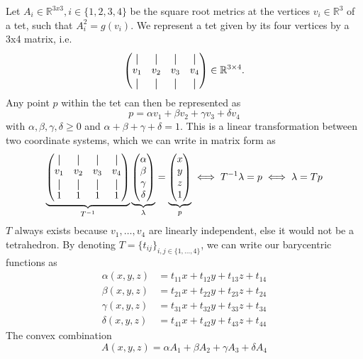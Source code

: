 \documentclass[../thesis.tex]{subfiles}
\begin{document}
Let $A_i \in \mathbb{R}^{3x3}, i \in \{1,2,3,4\}$ be the square root metrics at the vertices $v_i \in \mathbb{R}^3$ of a tet, such that
$A^2_i = g(v_i)$. We represent a tet given by its four vertices by a 3x4 matrix, i.e.
$$\begin{pmatrix}
  \vertbar & \vertbar & \vertbar & \vertbar \\
  v_1 & v_2 & v_3 & v_4 \\
  \vertbar & \vertbar & \vertbar & \vertbar
\end{pmatrix} \in \mathbb{R}^{3\times 4}.$$
Any point $p$ within the tet can then be represented as
$$p = \alpha v_1 + \beta v_2 + \gamma v_3 + \delta v_4$$
with $\alpha, \beta, \gamma, \delta \ge 0$ and $\alpha + \beta + \gamma + \delta = 1$.
This is a linear transformation between two coordinate systems, which we can write in matrix form as
$$\underbrace{\begin{pmatrix}
  \vertbar & \vertbar & \vertbar & \vertbar \\
  v_1 & v_2 & v_3 & v_4 \\
  \vertbar & \vertbar & \vertbar & \vertbar \\
  1 & 1 & 1 & 1
\end{pmatrix}}_{T^{-1}}
\underbrace{
\begin{pmatrix}
  \alpha \\ \beta \\ \gamma \\ \delta
\end{pmatrix}}_{\lambda} = \underbrace{\begin{pmatrix}
  x \\ y \\ z \\ 1 
\end{pmatrix}}_{p}
\iff
T^{-1}\lambda = p \iff  \lambda = Tp
$$
$T$ always exists because $v_1, \dots , v_4$ are linearly independent,
else it would not be a tetrahedron.
By denoting $T= \{ t_{ij} \}_{i,j \in \{ 1,\dots, 4\} }$, we can write our barycentric functions as
\begin{align*}
\alpha(x,y,z) &= t_{11}x + t_{12}y + t_{13}z + t_{14} \\
\beta(x,y,z) &= t_{21}x + t_{22}y + t_{23}z + t_{24} \\
\gamma(x,y,z) &= t_{31}x + t_{32}y + t_{33}z + t_{34} \\
\delta(x,y,z) &= t_{41}x + t_{42}y + t_{43}z + t_{44}
\end{align*}
The convex combination
$$A(x,y,z) = \alpha A_1 + \beta A_2 + \gamma A_3 + \delta A_4$$
\end{document}
